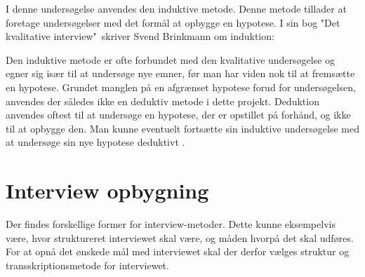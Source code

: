 \par
I denne undersøgelse anvendes den induktive metode. Denne metode tillader at foretage undersøgelser med det formål at opbygge en hypotese. 
I sin bog "Det kvalitative interview"\ skriver Svend Brinkmann om induktion:
\par
{} \citep{brinkmann2014}
\par
Den induktive metode er ofte forbundet med den kvalitative undersøgelse og egner sig især til at undersøge nye emner, før man har viden nok til at fremsætte en hypotese. Grundet manglen på en afgrænset hypotese forud for undersøgelsen, anvendes der således ikke en deduktiv metode i dette projekt. Deduktion anvendes oftest til at undersøge en hypotese, der er opstillet på forhånd, og ikke til at opbygge den. Man kunne eventuelt fortsætte sin induktive undersøgelse med at undersøge sin nye hypotese deduktivt \cite{deduktiv}.



\section{Interview opbygning}
Der findes forskellige former for interview-metoder. Dette kunne eksempelvis være, hvor struktureret interviewet skal være, og måden hvorpå det skal udføres. For at opnå det ønskede mål med interviewet skal der derfor vælges struktur og transskriptionsmetode for interviewet.

